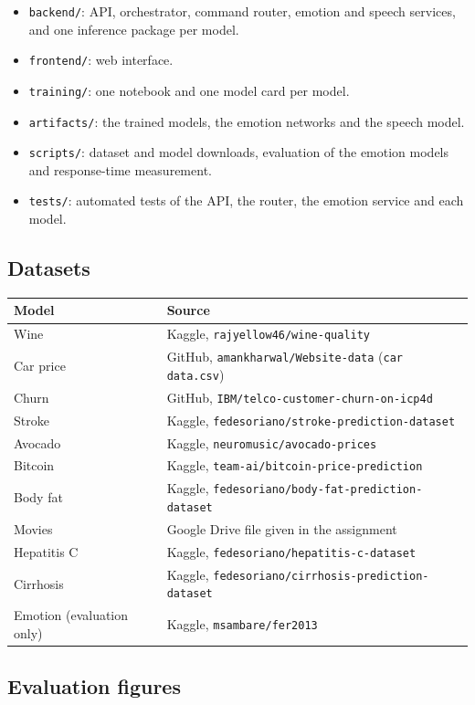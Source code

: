 \documentclass[11pt,letterpaper]{article}
\newcommand{\code}[1]{\texttt{#1}}
\begin{document}
\begin{itemize}
\item \code{backend/}: API, orchestrator, command router, emotion and speech services, and one inference package per model.
\item \code{frontend/}: web interface.
\item \code{training/}: one notebook and one model card per model.
\item \code{artifacts/}: the trained models, the emotion networks and the speech model.
\item \code{scripts/}: dataset and model downloads, evaluation of the emotion models and response-time measurement.
\item \code{tests/}: automated tests of the API, the router, the emotion service and each model.
\end{itemize}

\subsection{Datasets}

\begin{tabularx}{\textwidth}{lX}
\toprule
Model & Source \\
\midrule
Wine & Kaggle, \code{rajyellow46/wine-quality} \\
Car price & GitHub, \code{amankharwal/Website-data} (\code{car data.csv}) \\
Churn & GitHub, \code{IBM/telco-customer-churn-on-icp4d} \\
Stroke & Kaggle, \code{fedesoriano/stroke-prediction-dataset} \\
Avocado & Kaggle, \code{neuromusic/avocado-prices} \\
Bitcoin & Kaggle, \code{team-ai/bitcoin-price-prediction} \\
Body fat & Kaggle, \code{fedesoriano/body-fat-prediction-dataset} \\
Movies & Google Drive file given in the assignment \\
Hepatitis C & Kaggle, \code{fedesoriano/hepatitis-c-dataset} \\
Cirrhosis & Kaggle, \code{fedesoriano/cirrhosis-prediction-dataset} \\
Emotion (evaluation only) & Kaggle, \code{msambare/fer2013} \\
\bottomrule
\end{tabularx}

\subsection{Evaluation figures}
\label{app:figures}
\end{document}
